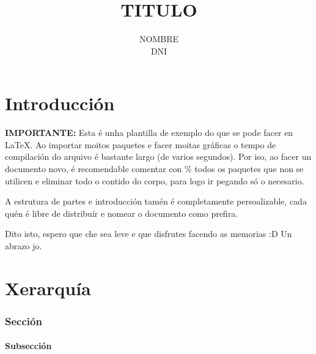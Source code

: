 \documentclass[12pt, a4paper, titlepage]{article}
\title{\textbf {TITULO}}
\author{{\Large NOMBRE}\\DNI}
\date{}
\begin{document}
  \maketitle

  \tableofcontents


  \newpage
  \part*{Introducción} %

  \textcolor{Vermello}{\textbf{IMPORTANTE:}} Esta é unha plantilla de exemplo do que se pode facer en \LaTeX. Ao importar moitos paquetes e facer moitas gráficas o tempo de compilación do arquivo é bastante largo (de varios segundos\footnotemark). Por iso, ao facer un documento novo, é recomendable comentar con \% todos os paquetes que non se utilicen e eliminar todo o contido do corpo, para logo ir pegando só o necesario.


  A estrutura de partes e introducción tamén é completamente persoalizable, cada quén é libre de distribuír e nomear o documento como prefira.

  Dito isto, espero que che sea leve e que disfrutes facendo as memorias :D Un abrazo jo.



  \newpage
  \part{Xerarquía}

  \section{Sección}

  \subsection{Subsección}
\end{document}
